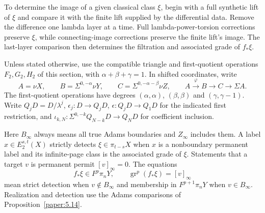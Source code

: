 To determine the image of a given classical class $\xi$, begin with a
full synthetic lift of $\xi$ and compare it with the finite lift supplied
by the differential data. Remove the difference one lambda layer at a
time. Full lambda-power-torsion corrections preserve $\xi$, while
connecting-image corrections preserve the finite lift's image.
The last-layer comparison then determines the filtration and associated
grade of $f_*\xi$.

Unless stated otherwise, use the compatible triangle and first-quotient
operations $F_2,G_2,H_2$ of this section, with
$\alpha+\beta+\gamma=1$. In shifted coordinates, write
\[
 A=\nu X,\qquad B=\Sigma^{0,-\alpha}\nu Y,\qquad
 C=\Sigma^{0,-\alpha-\beta}\nu Z,\qquad
 A\xrightarrow{\varphi}B\longrightarrow C\longrightarrow\Sigma A.
\]
The first-quotient operations have degrees $(\alpha,\alpha)$,
$(\beta,\beta)$ and $(\gamma,\gamma-1)$. Write
$Q_jD=D/\lambda^j$, $\epsilon_j:D\to Q_jD$,
$\epsilon:Q_jD\to Q_1D$ for the indicated first restriction, and
$\iota_{k,N}:\Sigma^{0,-k}Q_{N-k}D\to Q_ND$ for coefficient inclusion.

Here $B_\infty$ always means all true Adams boundaries and
$Z_\infty$ includes them. A label $x\in E_2^{s,t}(X)$ strictly detects
$\xi\in\pi_{t-s}X$ when $x$ is a nonboundary permanent label and its
infinite-page class is the associated grade of $\xi$. Statements that
a target $v$ is permanent permit $[v]_\infty=0$. The equations
\[
 f_*\xi\in F^p\pi_nY,\qquad
 \operatorname{gr}^{p}(f_*\xi)=[v]_\infty
\]
mean strict detection when $v\notin B_\infty$ and membership in
$F^{p+1}\pi_nY$ when $v\in B_\infty$. Realization and detection
use the Adams comparisons of Proposition~\ref{paper:5.14}.

